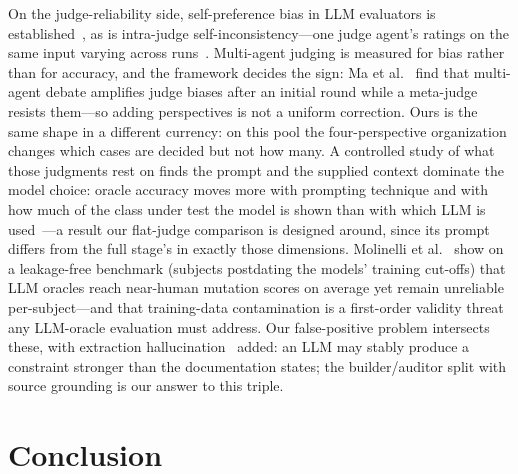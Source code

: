 \documentclass[acmsmall,screen,review,anonymous]{acmart}
\begin{document}
On the judge-reliability side, self-preference bias in LLM evaluators is established~\cite{zheng23judge,panickssery24,wataoka24}, as is intra-judge self-inconsistency---one judge agent's ratings on the same input varying across runs~\cite{haldar25}. Multi-agent judging is measured for bias rather than for accuracy, and the framework decides the sign: Ma et al.~\cite{manyminds25} find that multi-agent debate amplifies judge biases after an initial round while a meta-judge resists them---so adding perspectives is not a uniform correction. Ours is the same shape in a different currency: on this pool the four-perspective organization changes which cases are decided but not how many. A controlled study of what those judgments rest on finds the prompt and the supplied context dominate the model choice: oracle accuracy moves more with prompting technique and with how much of the class under test the model is shown than with which LLM is used~\cite{bodicoat25}---a result our flat-judge comparison is designed around, since its prompt differs from the full stage's in exactly those dimensions. Molinelli et al.~\cite{molinelli25} show on a leakage-free benchmark (subjects postdating the models' training cut-offs) that LLM oracles reach near-human mutation scores on average yet remain unreliable per-subject---and that training-data contamination is a first-order validity threat any LLM-oracle evaluation must address. Our false-positive problem intersects these, with extraction hallucination~\cite{ji23hall} added: an LLM may stably produce a constraint stronger than the documentation states; the builder/auditor split with source grounding is our answer to this triple.

\section{Conclusion}
\label{sec:conclusion}
\end{document}
